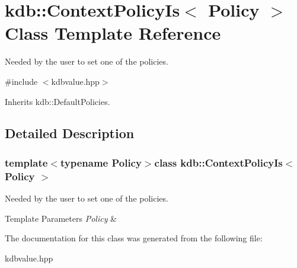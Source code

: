 \hypertarget{classkdb_1_1ContextPolicyIs}{\section{kdb\-:\-:Context\-Policy\-Is$<$ Policy $>$ Class Template Reference}
\label{classkdb_1_1ContextPolicyIs}
}


Needed by the user to set one of the policies.  




{\ttfamily \#include $<$kdbvalue.\-hpp$>$}



Inherits kdb\-::\-Default\-Policies.



\subsection{Detailed Description}
\subsubsection*{template$<$typename Policy$>$class kdb\-::\-Context\-Policy\-Is$<$ Policy $>$}

Needed by the user to set one of the policies. 


\begin{DoxyTemplParams}{Template Parameters}
{\em Policy} & \\
\hline
\end{DoxyTemplParams}


The documentation for this class was generated from the following file\-:\begin{DoxyCompactItemize}
\item 
kdbvalue.\-hpp\end{DoxyCompactItemize}
